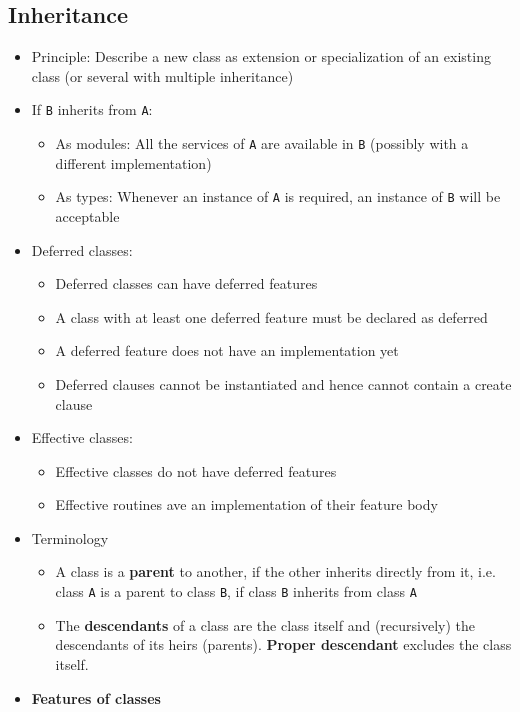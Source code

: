 \documentclass[a4paper]{article}
\newcommand{\inline}[1]{\lstinline!#1!}%
\begin{document}
\subsection{Inheritance}
\begin{itemize}
\item Principle: Describe a new class as extension or specialization of an existing class (or several with multiple inheritance)
\item If \inline{B} inherits from \inline{A}:
\begin{itemize}
\item As modules: All the services of \inline{A} are available in \inline{B} (possibly with a different implementation)
\item As types: Whenever an instance of \inline{A} is required, an instance of \inline{B} will be acceptable
\end{itemize}
\item Deferred classes:
\begin{itemize}
\item Deferred classes can have deferred features
\item A class with at least one deferred feature must be declared as deferred
\item A deferred feature does not have an implementation yet
\item Deferred clauses cannot be instantiated and hence cannot contain a create clause
\end{itemize}
\item Effective classes:
\begin{itemize}
\item Effective classes do not have deferred features
\item Effective routines ave an implementation of their feature body
\end{itemize}
\item Terminology
\begin{itemize}
\item A class is a \textbf{parent} to another, if the other inherits directly from it, i.e. class \inline{A} is a parent to class \inline{B}, if class \inline{B} inherits from class \inline{A}
\item The \textbf{descendants} of a class are the class itself and (recursively) the descendants of its heirs (parents). \textbf{Proper descendant} excludes the class itself.
\end{itemize}
\item \textbf{Features of classes}

\end{itemize}
\end{document}
